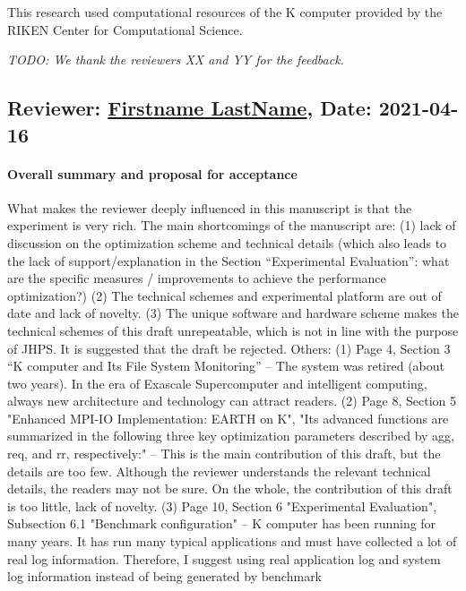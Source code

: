 \documentclass{jhps}
\begin{document}
This research used computational resources of the K computer
provided by the RIKEN Center for Computational Science.

\textit{TODO: We thank the reviewers XX and YY for the feedback.}



\reviews   %

\subsection*{Reviewer: \href{Optional URL to reviewer page}{Firstname LastName}, Date: 2021-04-16}

\paragraph{Overall summary and proposal for acceptance}
What makes the reviewer deeply influenced in this manuscript is that the experiment is very rich. The main shortcomings of the manuscript are: (1) lack of discussion on the optimization scheme and technical details (which also leads to the lack of support/explanation in the Section “Experimental Evaluation”: what are the specific measures / improvements to achieve the performance optimization?) (2) The technical schemes and experimental platform are out of date and lack of novelty. (3) The unique software and hardware scheme makes the technical schemes of this draft unrepeatable, which is not in line with the purpose of JHPS. It is suggested that the draft be rejected.
Others: (1) Page 4, Section 3 “K computer and Its File System Monitoring” -- The system was retired (about two years). In the era of Exascale Supercomputer and intelligent computing, always new architecture and technology can attract readers. (2) Page 8, Section 5 "Enhanced MPI-IO Implementation: EARTH on K", "Its advanced functions are summarized in the following three key optimization parameters described by agg, req, and rr, respectively:" -- This is the main contribution of this draft, but the details are too few. Although the reviewer understands the relevant technical details, the readers may not be sure. On the whole, the contribution of this draft is too little, lack of novelty. (3) Page 10, Section 6 "Experimental Evaluation", Subsection 6.1 "Benchmark configuration" -- K computer has been running for many years. It has run many typical applications and must have collected a lot of real log information. Therefore, I suggest using real application log and system log information instead of being generated by benchmark
\end{document}
